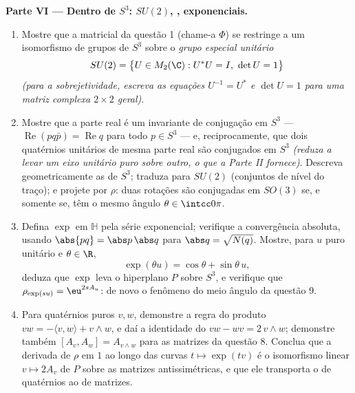 \begin{problem}
\medskip
\noindent\textbf{Parte VI --- Dentro de $S^3$: $SU(2)$, , exponenciais.}
\begin{enumerate}[resume]
  \item Mostre que a  matricial da questão 1
        (chame-a $\Phi$) se restringe a um isomorfismo de grupos de
        $S^3$ sobre o \emph{grupo especial unitário}
        \[
        SU(2) = \bigl\{U \in M_2(\C) : U^*U = I,\ \det U =
        1\bigr\}
        \]
        \emph{(para a sobrejetividade, escreva as equações $U^{-1} = U^*$ e $\det U = 1$
        para uma matriz complexa $2\times2$ geral)}.
  \item Mostre que a parte real é um invariante de conjugação em
        $S^3$ --- $\operatorname{Re}(pq\bar p) =
        \operatorname{Re}q$ para todo $p \in S^3$ --- e, reciprocamente, que
        dois quatérnios unitários de mesma parte real são conjugados em
        $S^3$ \emph{(reduza a levar um eixo unitário puro sobre
        outro, o que a Parte II fornece)}. Descreva geometricamente as
         de $S^3$; traduza para $SU(2)$
        (conjuntos de nível do traço); e projete por $\rho$: duas
        rotações são conjugadas em $SO(3)$ se, e somente se, têm o
        mesmo ângulo $\theta \in \intcc0\pi$.
  \item Defina $\exp$ em $\mathbb H$ pela série exponencial; verifique a
        convergência absoluta, usando $\abs{pq} = \abs p\,\abs q$ para $\abs q =
        \sqrt{N(q)}$. Mostre, para
        $u$ puro unitário e $\theta
        \in \R$,
        \[
        \exp(\theta u) = \cos\theta + \sin\theta\,u ,
        \]
        deduza que $\exp$ leva o hiperplano $P$ sobre $S^3$, e
        verifique que $\rho_{\exp(su)} =
        \eu^{2sA_u}$: de novo o fenômeno do meio ângulo da questão
        9.
  \item Para quatérnios puros $v, w$, demonstre a regra do produto
        $vw = -\langle v, w\rangle + v\wedge w$, e daí a identidade do  $vw - wv = 2\,v\wedge w$; demonstre também
        $[A_v, A_w] = A_{v\wedge w}$ para as matrizes da questão 8. Conclua que a derivada de
        $\rho$ em $1$ ao longo das curvas $t \mapsto \exp(tv)$ é o isomorfismo
        linear $v \mapsto 2A_v$ de $P$ sobre as matrizes antissimétricas, e que
        ele transporta o  de quatérnios ao  de
        matrizes.
\end{enumerate}


\end{problem}
